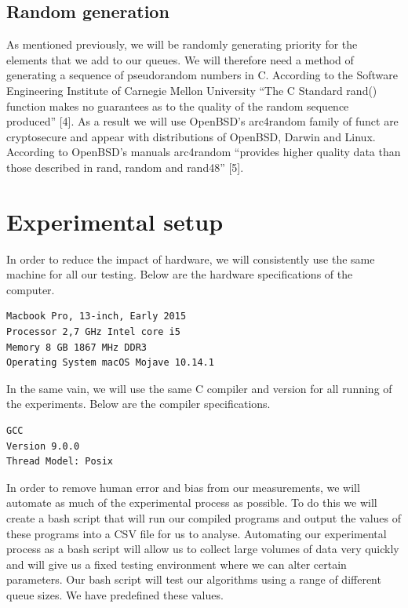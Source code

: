 \documentclass[12pt]{article}
\begin{document}
\subsection{Random generation}

As mentioned previously, we will be randomly generating priority for the elements that we add to our queues. We will therefore need a method of generating a sequence of pseudorandom numbers in C. According to the Software Engineering Institute of Carnegie Mellon University “The C Standard rand() function makes no guarantees as to the quality of the random sequence produced” [4]. As a result we will use OpenBSD’s arc4random family of funct are cryptosecure and appear with distributions of OpenBSD, Darwin and Linux. According to OpenBSD’s manuals arc4random “provides higher quality data than those described in rand, random and rand48” [5]. 

\section{Experimental setup}

In order to reduce the impact of hardware, we will consistently use the same machine for all our testing. Below are the hardware specifications of the computer.

\begin{verbatim}
Macbook Pro, 13-inch, Early 2015
Processor 2,7 GHz Intel core i5
Memory 8 GB 1867 MHz DDR3
Operating System macOS Mojave 10.14.1
\end{verbatim}

In the same vain, we will use the same C compiler and version for all running of the experiments. Below are the compiler specifications.

\begin{verbatim}
GCC
Version 9.0.0
Thread Model: Posix
\end{verbatim}

In order to remove human error and bias from our measurements, we will automate as much of the experimental process as possible. To do this we will create a bash script that will run our compiled programs and output the values of  these programs into a CSV file for us to analyse. Automating our experimental process as a bash script will allow us to collect large volumes of data very quickly and will give us a fixed testing environment where we can alter certain parameters. Our bash script will test our algorithms using a range of different queue sizes. We have predefined these values.
\end{document}
